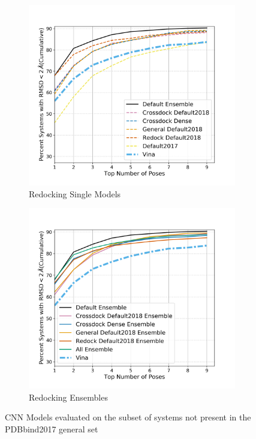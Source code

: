 \documentclass[journal=jcisd8,manuscript=article]{achemso}
\begin{document}
\begin{figure}    
        \begin{subfigure}[b]{0.48\textwidth}    
    		\centering
    		\includegraphics[width=\textwidth]{figures/redocking/single_models_no2017_line.png}
    		\caption{Redocking Single Models}
    		\label{fig:No2017SingleRD}
        \end{subfigure}    
        \begin{subfigure}[b]{0.48\textwidth}    
    		\centering
    		\includegraphics[width=\textwidth]{figures/redocking/ensemble_models_no2017_line.png}
    		\caption{Redocking Ensembles}
    		\label{fig:No2017EnsRD}
        \end{subfigure}    
	\caption{CNN Models evaluated on the subset of systems not present in the PDBbind2017 general set}
	\label{fig:No2017}
\end{figure}
\end{document}
